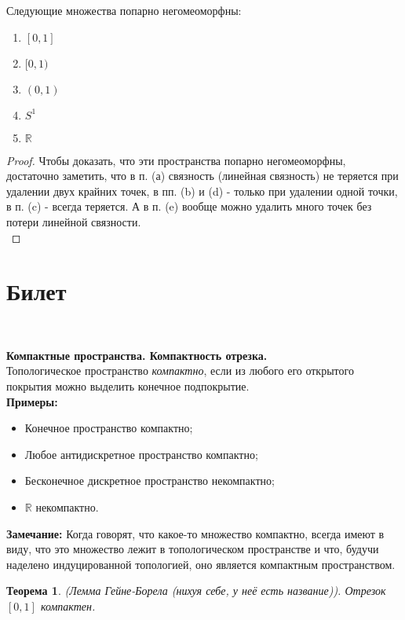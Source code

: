 \documentclass[a4paper,100pt]{article}
\theoremstyle{indented}
\newtheorem{theorem}{Теорема}
\begin{document}
Следующие множества попарно негомеоморфны:
\begin{enumerate}
    \item $[0, 1]$
    \item $[0, 1)$
    \item $(0, 1)$
    \item $S^1$
    \item $\mathbb{R}$
\end{enumerate}
\begin{proof}
Чтобы доказать, что эти пространства попарно негомеоморфны, достаточно заметить, что в п. (а) связность (линейная связность) не теряется при удалении двух крайних точек, в пп. (b) и (d) - только при удалении одной точки, в п. (c) - всегда теряется. А в п. (e) вообще можно удалить много точек без потери линейной связности.
\\
\end{proof}

\section{Билет} \

\medskip

\textbf{Компактные пространства. Компактность отрезка.}\\

Топологическое пространство \textit{компактно}, если из любого его открытого покрытия можно выделить конечное подпокрытие.\\

\textbf{Примеры:}\

\begin{itemize}
    \item Конечное пространство компактно;
    \item Любое антидискретное пространство компактно;
    \item Бесконечное дискретное пространство некомпактно;
    \item $\mathbb{R}$ некомпактно.
\end{itemize}

\textbf{Замечание:} Когда говорят, что какое-то множество компактно, всегда имеют в виду, что это множество лежит в топологическом пространстве и что, будучи наделено индуцированной топологией, оно является компактным пространством.\\

\begin{theorem}
    (Лемма Гейне-Борела (нихуя себе, у неё есть название)). Отрезок $[0,1]$ компактен.
\end{theorem}
\end{document}
